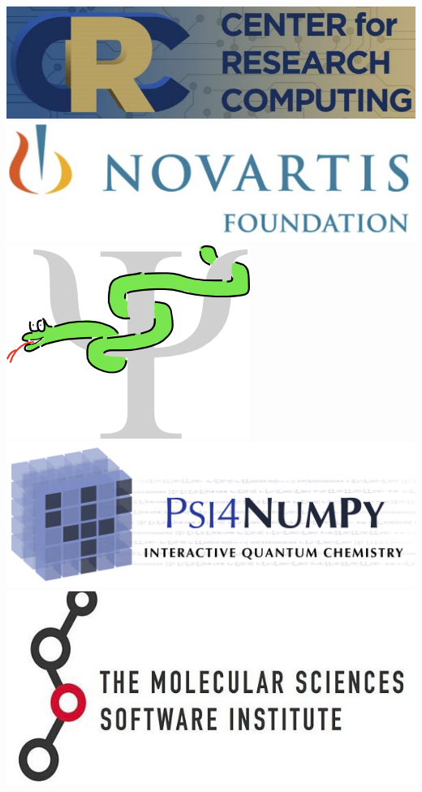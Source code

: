 \documentclass[%
    xcolor=usenames,dvipsnames,svgnames%
]{beamer}
\begin{document}
\begin{frame}
\begin{columns}
\begin{minipage}{1.0\linewidth}
      \includegraphics[width=0.85\linewidth,keepaspectratio]{./figures/logo_crc.jpg}
      \includegraphics[width=0.95\linewidth,keepaspectratio]{./figures/logo_novartis.png}
      \includegraphics[scale=0.15]{./figures/logo_cclib.png}
      \includegraphics[width=1.00\linewidth,keepaspectratio]{./figures/psi4numpybanner_eqn.png}
      \includegraphics[width=0.95\linewidth,keepaspectratio]{./figures/logo_molssi_text.jpg}
    \end{minipage}
  \end{columns}
\end{frame}
\end{document}
